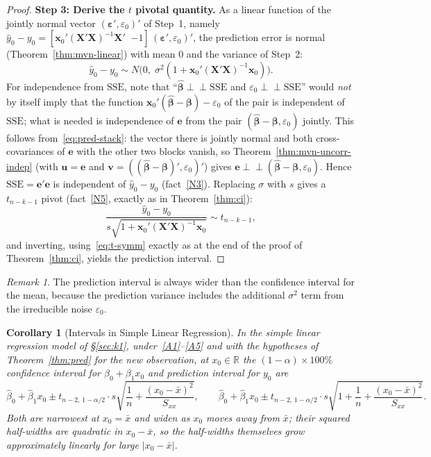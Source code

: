 \documentclass[14pt]{extarticle}
\theoremstyle{plain}
\newtheorem{corollary}[theorem]{Corollary}
\theoremstyle{definition}
\theoremstyle{remark}
\newtheorem{remark}[theorem]{Remark}
\newcommand{\SSE}{\mathrm{SSE}}
\newcommand{\bX}{\mathbf{X}}
\newcommand{\bx}{\mathbf{x}}
\def\bb{\boldsymbol{\beta}}
\newcommand{\be}{\boldsymbol{\varepsilon}}
\newcommand{\bv}{\mathbf{v}}
\newcommand{\Real}{\mathbb{R}}
\newcommand{\indep}{\perp\!\!\!\perp}
\newcommand{\bu}{\mathbf{u}}
\begin{document}
\begin{proof}
\textbf{Step 3: Derive the $t$ pivotal quantity.} As a linear function of the jointly normal vector $(\be', \varepsilon_0)'$ of Step~1, namely $\hat{y}_0 - y_0 = [\bx_0'(\bX'\bX)^{-1}\bX' \;\; {-1}]\,(\be', \varepsilon_0)'$, the prediction error is normal (Theorem~\ref{thm:mvn-linear}) with mean $0$ and the variance of Step~2:
\[
\hat{y}_0 - y_0 \sim N\!\bigl(0,\; \sigma^2(1 + \bx_0'(\bX'\bX)^{-1}\bx_0)\bigr).
\]
For independence from $\SSE$, note that ``$\hat{\bb} \indep \SSE$ and $\varepsilon_0 \indep \SSE$'' would \emph{not} by itself imply that the function $\bx_0'(\hat{\bb} - \bb) - \varepsilon_0$ of the pair is independent of $\SSE$; what is needed is independence of $\mathbf{e}$ from the pair $(\hat{\bb} - \bb, \varepsilon_0)$ jointly. This follows from~\eqref{eq:pred-stack}: the vector there is jointly normal and both cross-covariances of $\mathbf{e}$ with the other two blocks vanish, so Theorem~\ref{thm:mvn-uncorr-indep} (with $\bu = \mathbf{e}$ and $\bv = ((\hat{\bb} - \bb)', \varepsilon_0)'$) gives $\mathbf{e} \indep (\hat{\bb} - \bb, \varepsilon_0)$. Hence $\SSE = \mathbf{e}'\mathbf{e}$ is independent of $\hat{y}_0 - y_0$ (fact~\ref{N3}). Replacing $\sigma$ with $s$ gives a $t_{n-k-1}$ pivot (fact~\ref{N5}, exactly as in Theorem~\ref{thm:ci}):
\[
\frac{\hat{y}_0 - y_0}{s\sqrt{1 + \bx_0'(\bX'\bX)^{-1}\bx_0}} \sim t_{n-k-1},
\]
and inverting, using~\eqref{eq:t-symm} exactly as at the end of the proof of Theorem~\ref{thm:ci}, yields the prediction interval.
\end{proof}

\begin{remark}\label{rem:pi-wider}
The prediction interval is always wider than the confidence interval for the mean, because the prediction variance includes the additional $\sigma^2$ term from the irreducible noise $\varepsilon_0$.
\end{remark}

\begin{corollary}[Intervals in Simple Linear Regression]\label{cor:pred-slr}
In the simple linear regression model of \S\ref{sec:k1}, under~\ref{A1}--\ref{A5} and with the hypotheses of Theorem~\ref{thm:pred} for the new observation, at $x_0 \in \Real$ the $(1-\alpha) \times 100\%$ confidence interval for $\beta_0 + \beta_1x_0$ and prediction interval for $y_0$ are
\[
\hat\beta_0 + \hat\beta_1x_0 \pm t_{n-2,\,1-\alpha/2}\cdot s\sqrt{\frac{1}{n} + \frac{(x_0 - \bar x)^2}{S_{xx}}}, \qquad \hat\beta_0 + \hat\beta_1x_0 \pm t_{n-2,\,1-\alpha/2}\cdot s\sqrt{1 + \frac{1}{n} + \frac{(x_0 - \bar x)^2}{S_{xx}}}.
\]
Both are narrowest at $x_0 = \bar x$ and widen as $x_0$ moves away from $\bar x$; their squared half-widths are quadratic in $x_0 - \bar x$, so the half-widths themselves grow approximately linearly for large $|x_0 - \bar x|$.
\end{corollary}
\end{document}
